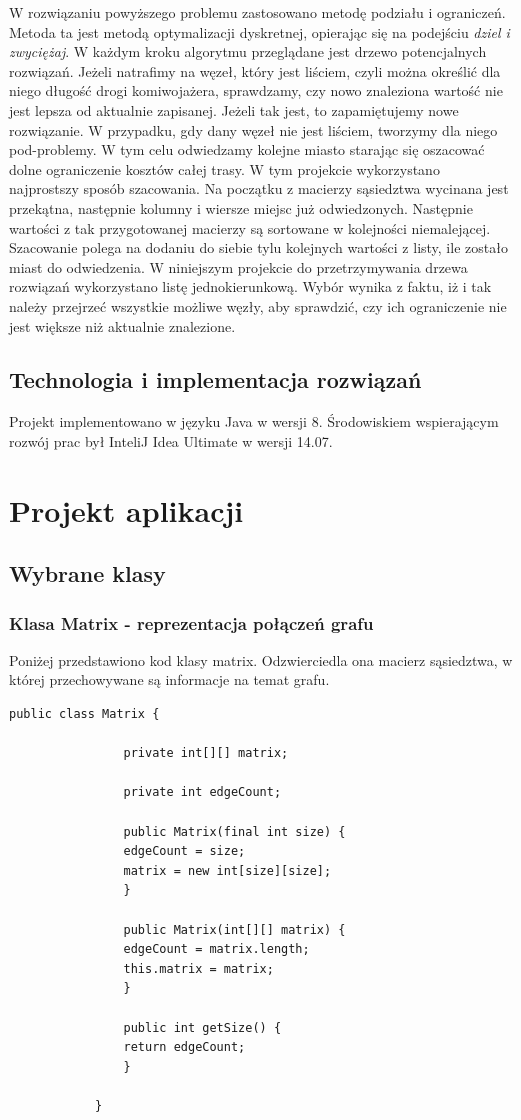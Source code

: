 \documentclass{article}
\begin{document}
				W rozwiązaniu powyższego problemu zastosowano metodę podziału i ograniczeń. Metoda ta jest metodą optymalizacji dyskretnej, opierając się na podejściu \textit{dziel i zwyciężaj}.
				W każdym kroku algorytmu przeglądane jest drzewo potencjalnych rozwiązań. Jeżeli natrafimy na węzeł, który jest liściem, czyli można określić dla niego długość drogi komiwojażera, sprawdzamy, czy nowo znaleziona wartość nie jest lepsza od aktualnie zapisanej. Jeżeli tak jest, to zapamiętujemy nowe rozwiązanie. W przypadku, gdy dany węzeł nie jest liściem, tworzymy dla niego pod-problemy. W tym celu odwiedzamy kolejne miasto starając się oszacować dolne ograniczenie kosztów całej trasy. W tym projekcie wykorzystano najprostszy sposób szacowania. Na początku z macierzy sąsiedztwa wycinana jest przekątna, następnie kolumny i wiersze miejsc już odwiedzonych. Następnie wartości z tak przygotowanej macierzy są sortowane w kolejności niemalejącej. Szacowanie polega na dodaniu do siebie tylu kolejnych wartości z listy, ile zostało miast do odwiedzenia. W niniejszym projekcie do przetrzymywania drzewa rozwiązań wykorzystano listę jednokierunkową. Wybór wynika z faktu, iż i tak należy przejrzeć wszystkie możliwe węzły, aby sprawdzić, czy ich ograniczenie nie jest większe niż aktualnie znalezione.
	\subsection{Technologia i implementacja rozwiązań}	
		Projekt implementowano 	w języku Java w wersji 8. Środowiskiem wspierającym rozwój prac był InteliJ Idea Ultimate w wersji 14.07.   	
\section{Projekt aplikacji}	
	\subsection{Wybrane klasy}
	
		\subsubsection{Klasa Matrix - reprezentacja połączeń grafu}
			Poniżej przedstawiono kod klasy matrix. Odzwierciedla ona macierz sąsiedztwa, w której przechowywane są informacje na temat grafu.
			
			\begin{lstlisting}[xleftmargin=-100pt]
			public class Matrix {
			
				private int[][] matrix;
			
				private int edgeCount;
				
				public Matrix(final int size) {
				edgeCount = size;
				matrix = new int[size][size];
				}
				
				public Matrix(int[][] matrix) {
				edgeCount = matrix.length;
				this.matrix = matrix;
				}
										
				public int getSize() {
				return edgeCount;
				}
				
			}
			\end{lstlisting}
\end{document}
